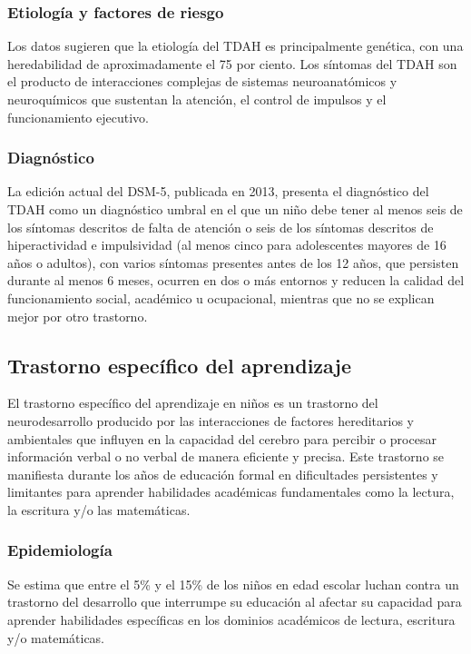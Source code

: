 \documentclass[11pt,letterpaper]{report}
\begin{document}
\subsubsection{Etiología y factores de riesgo}
Los datos sugieren que la etiología del TDAH es principalmente genética, con
una heredabilidad de aproximadamente el 75 por ciento. Los síntomas del TDAH
son el producto de interacciones complejas de sistemas neuroanatómicos y
neuroquímicos que sustentan la atención, el control de impulsos y el
funcionamiento ejecutivo. \cite{Boland2021-by}

\subsubsection{Diagnóstico}
La edición actual del DSM-5, publicada en 2013, presenta el diagnóstico del
TDAH como un diagnóstico umbral en el que un niño debe tener al menos seis de
los síntomas descritos de falta de atención o seis de los síntomas descritos
de hiperactividad e impulsividad (al menos cinco para adolescentes mayores de
16 años o adultos), con varios síntomas presentes antes de los 12 años, que
persisten durante al menos 6 meses, ocurren en dos o más entornos y reducen la
calidad del funcionamiento social, académico u ocupacional, mientras que no se
explican mejor por otro trastorno. \cite{Lazar2025}

\subsection{Trastorno específico del aprendizaje}
El trastorno específico del aprendizaje en niños es un trastorno del
neurodesarrollo producido por las interacciones de factores hereditarios y
ambientales que influyen en la capacidad del cerebro para percibir o procesar
información verbal o no verbal de manera eficiente y precisa. Este trastorno
se manifiesta durante los años de educación formal en dificultades
persistentes y limitantes para aprender habilidades académicas fundamentales
como la lectura, la escritura y/o las matemáticas. \cite{Frierson2025}

\subsubsection{Epidemiología}
Se estima que entre el 5\% y el 15\% de los niños en edad escolar luchan
contra un trastorno del desarrollo que interrumpe su educación al afectar su
capacidad para aprender habilidades específicas en los dominios académicos de
lectura, escritura y/o matemáticas. \cite{Frierson2025}
\end{document}
